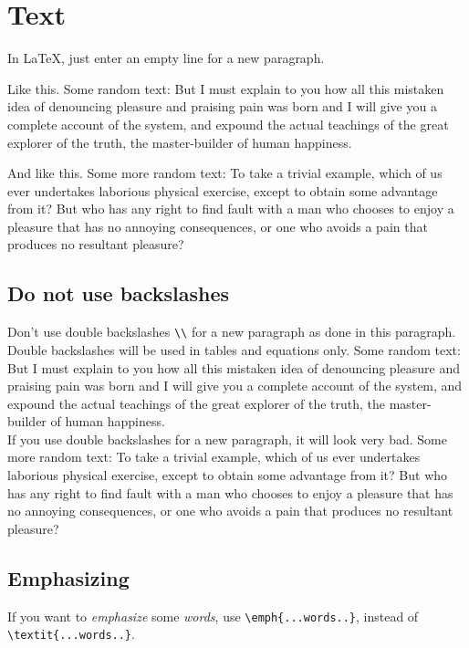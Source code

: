 \documentclass[letterpaper, 11pt]{article}
\newenvironment{textexample}
 {\VerbatimOut{\jobname.tmp}}
 {\endVerbatimOut
  \lstset{basicstyle=\linespread{1.0}\ttfamily\normalsize}
  \begin{framed}\end{framed}
  
 \begin{framed}\noindent\end{framed}
}
\begin{document}
\section{Text} \label{sec:paragraph}
\begin{textexample}
In LaTeX, just enter an empty line for a new paragraph.

Like this. Some random text: But I must explain to you how all this mistaken idea of denouncing pleasure and praising pain was born and I will give you a complete account of the system, and expound the actual teachings of the great explorer of the truth, the master-builder of human happiness.

And like this.
Some more random text: 
To take a trivial example, 
which of us ever undertakes laborious physical exercise, 
except to obtain some advantage from it? 
But who has any right to find fault with a man who chooses to enjoy a pleasure that has no annoying consequences, 
or one who avoids a pain that produces no resultant pleasure?
\end{textexample}

\subsection{Do not use backslashes}

\begin{textexample}
Don't use double backslashes \verb|\\| for a new paragraph as done in this paragraph.
Double backslashes will be used in tables and equations only.
Some random text: But I must explain to you how all this mistaken idea of denouncing pleasure and praising pain was born and I will give you a complete account of the system, and expound the actual teachings of the great explorer of the truth, the master-builder of human happiness. \\
If you use double backslashes for a new paragraph, it will look very bad.
Some more random text: To take a trivial example, which of us ever undertakes laborious physical exercise, except to obtain some advantage from it? But who has any right to find fault with a man who chooses to enjoy a pleasure that has no annoying consequences, or one who avoids a pain that produces no resultant pleasure?
\end{textexample}


\subsection{Emphasizing}
If you want to \emph{emphasize} some \emph{words}, use \verb|\emph{...words..}|, instead of \verb|\textit{...words..}|.
\end{document}
